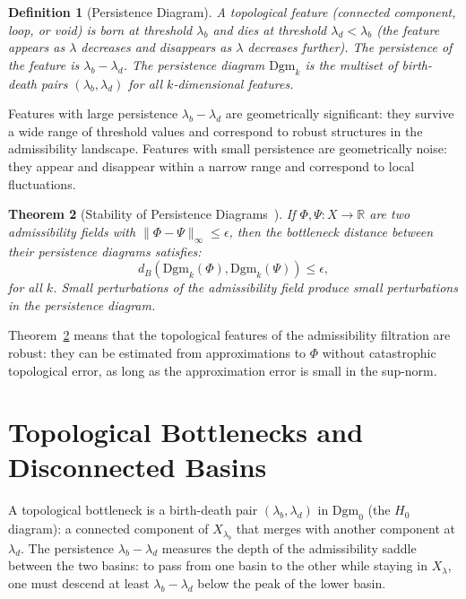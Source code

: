 \documentclass[12pt, oneside]{book}
\theoremstyle{plain-flyxion}
\newtheorem{theorem}{Theorem}[chapter]
\theoremstyle{definition-flyxion}
\newtheorem{definition}[theorem]{Definition}
\begin{document}
\begin{definition}[Persistence Diagram]\label{def:persistence}
A topological feature (connected component, loop, or void) is \emph{born} at threshold
$\lambda_b$ and \emph{dies} at threshold $\lambda_d < \lambda_b$ (the feature appears as
$\lambda$ decreases and disappears as $\lambda$ decreases further). The \emph{persistence}
of the feature is $\lambda_b - \lambda_d$. The \emph{persistence diagram} $\mathrm{Dgm}_k$
is the multiset of birth-death pairs $(\lambda_b, \lambda_d)$ for all $k$-dimensional
features.
\end{definition}

Features with large persistence $\lambda_b - \lambda_d$ are geometrically significant:
they survive a wide range of threshold values and correspond to robust structures in the
admissibility landscape. Features with small persistence are geometrically noise: they
appear and disappear within a narrow range and correspond to local fluctuations.

\begin{theorem}[Stability of Persistence Diagrams~\cite{carlsson2009}]\label{thm:stability}
If $\Phi, \Psi: X \to \mathbb{R}$ are two admissibility fields with $\|\Phi - \Psi\|_\infty
\leq \epsilon$, then the bottleneck distance between their persistence diagrams satisfies:
\begin{equation}\label{eq:stability-pd}
d_B(\mathrm{Dgm}_k(\Phi), \mathrm{Dgm}_k(\Psi)) \leq \epsilon,
\end{equation}
for all $k$. Small perturbations of the admissibility field produce small perturbations
in the persistence diagram.
\end{theorem}

Theorem~\ref{thm:stability} means that the topological features of the admissibility
filtration are robust: they can be estimated from approximations to $\Phi$ without
catastrophic topological error, as long as the approximation error is small in the
sup-norm.

\section{Topological Bottlenecks and Disconnected Basins}

A topological bottleneck is a birth-death pair $(\lambda_b, \lambda_d)$ in
$\mathrm{Dgm}_0$ (the $H_0$ diagram): a connected component of $X_{\lambda_b}$ that
merges with another component at $\lambda_d$. The persistence $\lambda_b - \lambda_d$
measures the depth of the admissibility saddle between the two basins: to pass from one
basin to the other while staying in $X_\lambda$, one must descend at least
$\lambda_b - \lambda_d$ below the peak of the lower basin.
\end{document}
